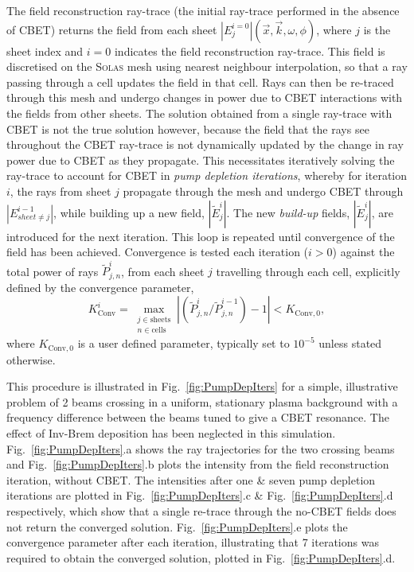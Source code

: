 The field reconstruction ray-trace (the initial ray-trace performed in the absence of \ac{CBET}) returns the field from each sheet $|E_j^{i=0}|(\vec{x},\vec{k},\omega,\phi)$, where $j$ is the sheet index and $i=0$ indicates the field reconstruction ray-trace.
This field is discretised on the \textsc{Solas} mesh using nearest neighbour interpolation, so that a ray passing through a cell updates the field in that cell.
Rays can then be re-traced through this mesh and undergo changes in power due to \ac{CBET} interactions with the fields from other sheets.
The solution obtained from a single ray-trace with \ac{CBET} is not the true solution however, because the field that the rays see throughout the \ac{CBET} ray-trace is not dynamically updated by the change in ray power due to \ac{CBET} as they propagate.
This necessitates iteratively solving the ray-trace to account for \ac{CBET} in \textit{pump depletion iterations}, whereby for iteration $i$, the rays from sheet $j$ propagate through the mesh and undergo \ac{CBET} through $|E_{sheet\neq j}^{i-1}|$, while building up a new field, $|\tilde{E}_{j}^{i}|$.
The new \textit{build-up} fields, $|\tilde{E}_{j}^{i}|$, are introduced for the next iteration.
This loop is repeated until convergence of the field has been achieved.
Convergence is tested each iteration ($i>0$) against the total power of rays $\tilde{P}_{j,n}^{i}$, from each sheet $j$ travelling through each cell, explicitly defined by the convergence parameter,
\begin{equation}
    K_{\text{Conv}}^i = \max_{\substack{j\in \text{sheets} \\ n\in \text{cells}}} \left| \left( \tilde{P}_{j,n}^{i}/\tilde{P}_{j,n}^{i-1} \right) -1 \right| < K_{\text{Conv},0},
\end{equation}
where $K_{\text{Conv},0}$ is a user defined parameter, typically set to $10^{-5}$ unless stated otherwise.

This procedure is illustrated in Fig.~\ref{fig:PumpDepIters} for a simple, illustrative problem of 2 beams crossing in a uniform, stationary plasma background with a frequency difference between the beams tuned to give a \ac{CBET} resonance.
The effect of \ac{Inv-Brem} deposition has been neglected in this simulation.
Fig.~\ref{fig:PumpDepIters}.a shows the ray trajectories for the two crossing beams and Fig.~\ref{fig:PumpDepIters}.b plots the intensity from the field reconstruction iteration, without \ac{CBET}.
The intensities after one \& seven pump depletion iterations are plotted in Fig.~\ref{fig:PumpDepIters}.c \& Fig.~\ref{fig:PumpDepIters}.d respectively, which show that a single re-trace through the no-\ac{CBET} fields does not return the converged solution.
Fig.~\ref{fig:PumpDepIters}.e plots the convergence parameter after each iteration, illustrating that 7 iterations was required to obtain the converged solution, plotted in Fig.~\ref{fig:PumpDepIters}.d.

